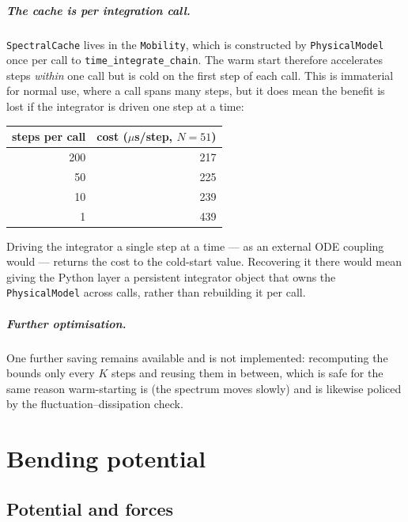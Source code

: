 \documentclass[11pt,a4paper]{report}
\newcommand{\code}[1]{\texttt{\seqsplitcode{#1}}}
\newcommand{\seqsplitcode}[1]{#1}
\begin{document}
\paragraph{The cache is per integration call.} \code{SpectralCache} lives in the
\code{Mobility}, which is constructed by \code{PhysicalModel} once per call to
\code{time\_integrate\_chain}. The warm start therefore accelerates steps
\emph{within} one call but is cold on the first step of each call. This is
immaterial for normal use, where a call spans many steps, but it does mean the
benefit is lost if the integrator is driven one step at a time:

\begin{center}
\begin{tabular}{@{}rr@{}}
\toprule
steps per call & cost ($\mu$s/step, $N=51$) \\
\midrule
200 & 217 \\
50  & 225 \\
10  & 239 \\
1   & 439 \\
\bottomrule
\end{tabular}
\end{center}

Driving the integrator a single step at a time --- as an external ODE coupling
would --- returns the cost to the cold-start value. Recovering it there would mean
giving the Python layer a persistent integrator object that owns the
\code{PhysicalModel} across calls, rather than rebuilding it per call.

\paragraph{Further optimisation.} One further saving remains available and is not
implemented: recomputing the bounds only every $K$ steps and reusing them in
between, which is safe for the same reason warm-starting is (the spectrum moves
slowly) and is likewise policed by the fluctuation--dissipation check.

\chapter{Bending potential}
\label{ch:bending}

\section{Potential and forces}
\end{document}
